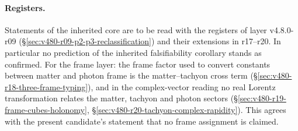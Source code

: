 \paragraph{Registers.}
Statements of the inherited core are to be read with the registers of
layer v4.8.0-r09 (\S\ref{sec:v480-r09-p2-p3-reclassification}) and
their extensions in r17--r20. In particular no prediction of the
inherited falsifiability corollary stands as confirmed. For the frame
layer: the frame factor used to convert constants between matter and
photon frame is the matter--tachyon cross term
(\S\ref{sec:v480-r18-three-frame-typing}), and in the complex-vector
reading no real Lorentz transformation relates the matter, tachyon and
photon sectors (\S\ref{sec:v480-r19-frame-cubes-holonomy},
\S\ref{sec:v480-r20-tachyon-complex-rapidity}). This agrees with the
present candidate's statement that no frame assignment is claimed.
